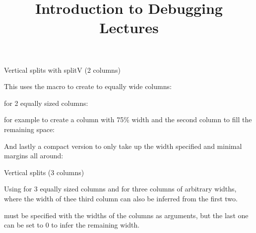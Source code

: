 \documentclass[11pt,compress,t,notes=noshow, xcolor=table]{beamer}
\title{Introduction to Debugging Lectures}
\begin{document}

\begin{vbframe}{Vertical splits with splitV (2 columns)}

This uses the  macro to create to equally wide columns:

 for 2 equally sized columns:

\vfill


\vfill

 for example to create a column with 75\% width and the
 second column to fill the remaining space:

\vfill


\vfill

And lastly a compact version  to only take up the width specified and minimal margins all around:

\vfill


\vfill


\end{vbframe}

\begin{vbframe}{Vertical splits  (3 columns)}

Using  for 3 equally sized columns and  for three columns of 
arbitrary widths, where the width of thee third column can also be inferred from the first two.
\vfill


\vfill

 must be specified with the widths of the columns as arguments, but the last 
one can be set to 0 to infer the remaining width.

\vfill




\end{vbframe}
\end{document}
